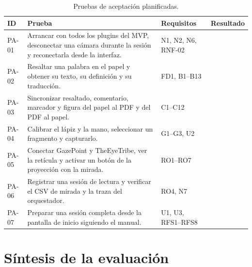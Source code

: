 \begin{table}[H]
\centering
\caption{Pruebas de aceptación planificadas.}
\label{tab:aceptacion}
\footnotesize
\begin{tabularx}{\textwidth}{l >{\raggedright\arraybackslash}X >{\raggedright\arraybackslash}p{3.2cm} c}
\toprule
ID & Prueba & Requisitos & Resultado \\ \midrule
PA-01 & Arrancar con todos los plugins del MVP, desconectar una cámara durante la sesión y reconectarla desde la interfaz. & N1, N2, N6, RNF-02 & \pendiente{} \\
PA-02 & Resaltar una palabra en el papel y obtener su texto, su definición y su traducción. & FD1, B1--B13 & \pendiente{} \\
PA-03 & Sincronizar resaltado, comentario, marcador y figura del papel al PDF y del PDF al papel. & C1--C12 & \pendiente{} \\
PA-04 & Calibrar el lápiz y la mano, seleccionar un fragmento y capturarlo. & G1--G3, U2 & \pendiente{} \\
PA-05 & Conectar GazePoint y TheEyeTribe, ver la retícula y activar un botón de la proyección con la mirada. & RO1--RO7 & \pendiente{} \\
PA-06 & Registrar una sesión de lectura y verificar el CSV de mirada y la traza del orquestador. & RO4, N7 & \pendiente{} \\
PA-07 & Preparar una sesión completa desde la pantalla de inicio siguiendo el manual. & U1, U3, RFS1--RFS8 & \pendiente{} \\ \bottomrule
\end{tabularx}
\end{table}

\section{Síntesis de la evaluación}

